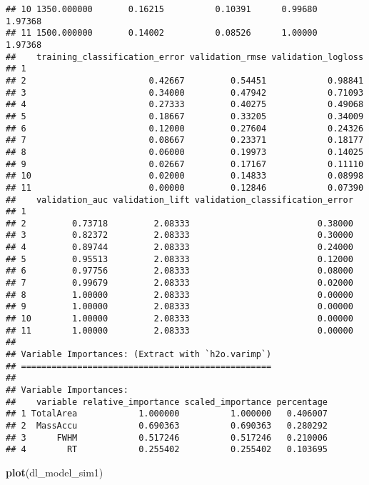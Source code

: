 \documentclass[]{article}
\newenvironment{Shaded}{\begin{snugshade}}{\end{snugshade}}
\newcommand{\KeywordTok}[1]{\textcolor[rgb]{0.13,0.29,0.53}{\textbf{#1}}}
\newcommand{\NormalTok}[1]{#1}
\begin{document}
\begin{verbatim}
## 10 1350.000000       0.16215          0.10391      0.99680       1.97368
## 11 1500.000000       0.14002          0.08526      1.00000       1.97368
##    training_classification_error validation_rmse validation_logloss
## 1                                                                  
## 2                        0.42667         0.54451            0.98841
## 3                        0.34000         0.47942            0.71093
## 4                        0.27333         0.40275            0.49068
## 5                        0.18667         0.33205            0.34009
## 6                        0.12000         0.27604            0.24326
## 7                        0.08667         0.23371            0.18177
## 8                        0.06000         0.19973            0.14025
## 9                        0.02667         0.17167            0.11110
## 10                       0.02000         0.14833            0.08998
## 11                       0.00000         0.12846            0.07390
##    validation_auc validation_lift validation_classification_error
## 1                                                                
## 2         0.73718         2.08333                         0.38000
## 3         0.82372         2.08333                         0.30000
## 4         0.89744         2.08333                         0.24000
## 5         0.95513         2.08333                         0.12000
## 6         0.97756         2.08333                         0.08000
## 7         0.99679         2.08333                         0.02000
## 8         1.00000         2.08333                         0.00000
## 9         1.00000         2.08333                         0.00000
## 10        1.00000         2.08333                         0.00000
## 11        1.00000         2.08333                         0.00000
## 
## Variable Importances: (Extract with `h2o.varimp`) 
## =================================================
## 
## Variable Importances: 
##    variable relative_importance scaled_importance percentage
## 1 TotalArea            1.000000          1.000000   0.406007
## 2  MassAccu            0.690363          0.690363   0.280292
## 3      FWHM            0.517246          0.517246   0.210006
## 4        RT            0.255402          0.255402   0.103695
\end{verbatim}

\begin{Shaded}
\begin{Highlighting}[]
\KeywordTok{plot}\NormalTok{(dl_model_sim1)}
\end{Highlighting}
\end{Shaded}
\end{document}
